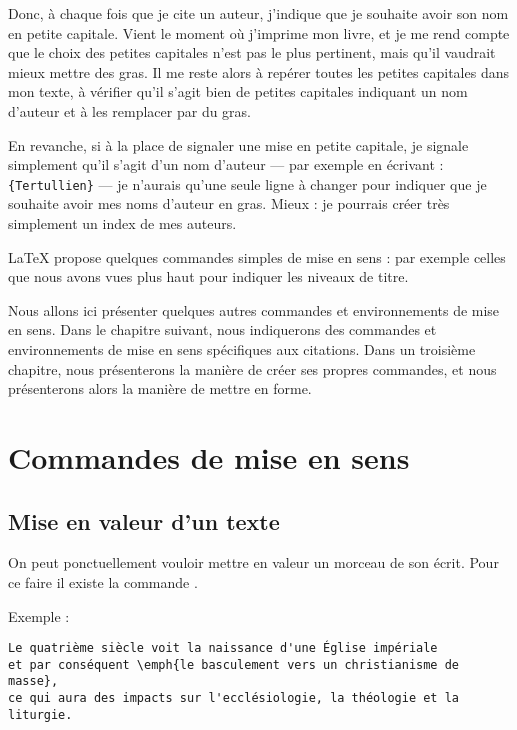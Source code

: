 Donc, à chaque fois que je cite un auteur, j'indique que je souhaite avoir son nom en petite capitale.
Vient le moment où j'imprime mon livre, et je me rend compte que le choix des petites capitales n'est pas le plus pertinent, mais qu'il vaudrait mieux mettre des gras. Il me reste alors à repérer toutes les petites capitales dans mon texte, à vérifier qu'il s'agit bien de petites capitales indiquant un nom d'auteur et à les remplacer par du gras.

En revanche, si à la place de signaler une mise en petite capitale, je signale simplement  qu'il s'agit d'un nom d'auteur --- par exemple en écrivant : \verb|{Tertullien}| --- je n'aurais qu'une seule ligne à changer pour indiquer que je souhaite avoir mes noms d'auteur en gras. Mieux : je pourrais créer très simplement un index de mes auteurs.

LaTeX propose quelques commandes simples de mise en sens  : par exemple celles que nous avons vues plus haut pour indiquer les niveaux de titre.

Nous allons ici présenter quelques autres commandes et environnements de mise en sens. Dans le chapitre suivant, nous indiquerons des commandes et environnements de mise en sens spécifiques aux citations. Dans un troisième chapitre, nous présenterons la manière de créer ses propres commandes, et nous présenterons alors la manière de mettre en forme.

\section{Commandes de mise en sens}

\subsection{Mise en valeur d'un texte}

On peut ponctuellement vouloir mettre en valeur un morceau de son écrit. Pour ce faire il existe la commande .

Exemple :

\begin{verbatim}
Le quatrième siècle voit la naissance d'une Église impériale
et par conséquent \emph{le basculement vers un christianisme de masse},
ce qui aura des impacts sur l'ecclésiologie, la théologie et la liturgie.
\end{verbatim}

